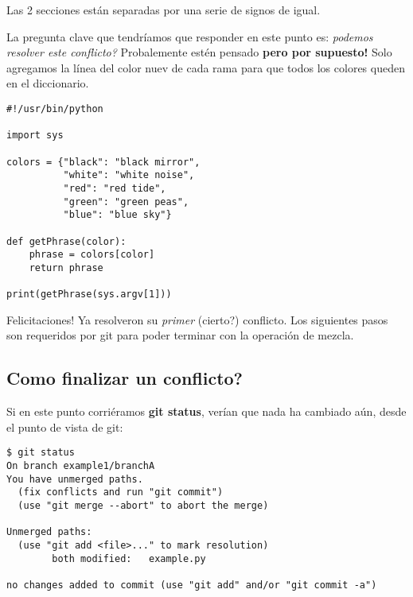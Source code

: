 Las 2 secciones están separadas por una serie de signos de igual.


La pregunta clave que tendríamos que responder en este punto es: {\it podemos resolver este conflicto?}
Probalemente estén pensado {\bf pero por supuesto!} Solo agregamos la línea del color nuev de cada rama para que todos
los colores queden en el diccionario.

\begin{lstlisting}[style=python_style, caption={\bf Ejemplo 1} - conflicto resuelto]
#!/usr/bin/python

import sys

colors = {"black": "black mirror",
          "white": "white noise",
          "red": "red tide",
          "green": "green peas",
          "blue": "blue sky"}

def getPhrase(color):
    phrase = colors[color]
    return phrase

print(getPhrase(sys.argv[1]))
\end{lstlisting}

Felicitaciones! Ya resolveron su {\it primer} (cierto?) conflicto. Los siguientes pasos son requeridos por git para poder
terminar con la operación de mezcla.

\subsection{Como finalizar un conflicto?}

Si en este punto corriéramos {\bf git status}, verían que nada ha cambiado aún, desde el punto de vista de git:

\begin{lstlisting}[style=console_style, caption={\bf git status} luego de editar el archivo]
$ git status
On branch example1/branchA
You have unmerged paths.
  (fix conflicts and run "git commit")
  (use "git merge --abort" to abort the merge)

Unmerged paths:
  (use "git add <file>..." to mark resolution)
        both modified:   example.py

no changes added to commit (use "git add" and/or "git commit -a")
\end{lstlisting}


